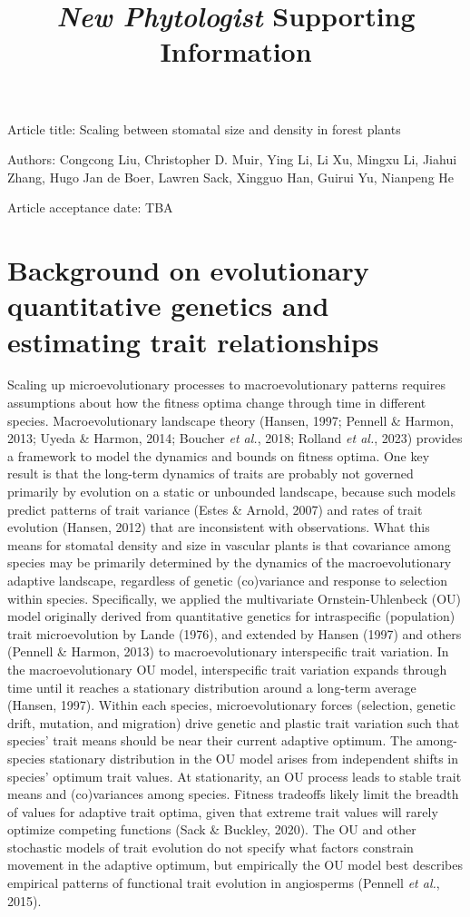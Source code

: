 \documentclass[
  letterpaper,
  DIV=11,
  numbers=noendperiod]{scrartcl}
\title{\emph{New Phytologist} Supporting Information}
\author{}
\date{}
\begin{document}
\maketitle

Article title: Scaling between stomatal size and density in forest
plants

Authors: Congcong Liu, Christopher D. Muir, Ying Li, Li Xu, Mingxu Li,
Jiahui Zhang, Hugo Jan de Boer, Lawren Sack, Xingguo Han, Guirui Yu,
Nianpeng He

Article acceptance date: TBA

\section{Background on evolutionary quantitative genetics and estimating
trait relationships}\label{sec-background}

Scaling up microevolutionary processes to macroevolutionary patterns
requires assumptions about how the fitness optima change through time in
different species. Macroevolutionary landscape theory (Hansen, 1997;
Pennell \& Harmon, 2013; Uyeda \& Harmon, 2014; Boucher \emph{et al.},
2018; Rolland \emph{et al.}, 2023) provides a framework to model the
dynamics and bounds on fitness optima. One key result is that the
long-term dynamics of traits are probably not governed primarily by
evolution on a static or unbounded landscape, because such models
predict patterns of trait variance (Estes \& Arnold, 2007) and rates of
trait evolution (Hansen, 2012) that are inconsistent with observations.
What this means for stomatal density and size in vascular plants is that
covariance among species may be primarily determined by the dynamics of
the macroevolutionary adaptive landscape, regardless of genetic
(co)variance and response to selection within species. Specifically, we
applied the multivariate Ornstein-Uhlenbeck (OU) model originally
derived from quantitative genetics for intraspecific (population) trait
microevolution by Lande (1976), and extended by Hansen (1997) and others
(Pennell \& Harmon, 2013) to macroevolutionary interspecific trait
variation. In the macroevolutionary OU model, interspecific trait
variation expands through time until it reaches a stationary
distribution around a long-term average (Hansen, 1997). Within each
species, microevolutionary forces (selection, genetic drift, mutation,
and migration) drive genetic and plastic trait variation such that
species' trait means should be near their current adaptive optimum. The
among-species stationary distribution in the OU model arises from
independent shifts in species' optimum trait values. At stationarity, an
OU process leads to stable trait means and (co)variances among species.
Fitness tradeoffs likely limit the breadth of values for adaptive trait
optima, given that extreme trait values will rarely optimize competing
functions (Sack \& Buckley, 2020). The OU and other stochastic models of
trait evolution do not specify what factors constrain movement in the
adaptive optimum, but empirically the OU model best describes empirical
patterns of functional trait evolution in angiosperms (Pennell \emph{et
al.}, 2015).
\end{document}

